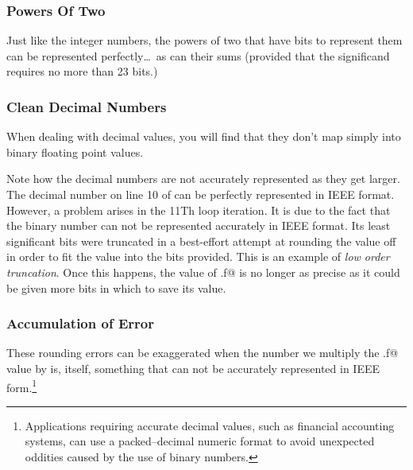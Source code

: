 \subsubsection{Powers Of Two}
Just like the integer numbers, the powers of two that have bits to represent 
them can be represented perfectly\ldots\ as can their sums (provided that the
significand requires no more than 23 bits.)


\subsubsection{Clean Decimal Numbers}
When dealing with decimal values, you will find that they don't map simply
into binary floating point values.

Note how the decimal numbers are not accurately represented as they get larger.
The decimal number on line 10 of 
can be perfectly represented in IEEE format.  However, a problem arises in 
the 11Th loop iteration.  It is due to the fact that the
binary number can not be represented accurately in IEEE format.  Its least
significant bits were truncated in a best-effort attempt at rounding the value
off in order to fit the value into the bits provided.  This is an example of
{\em low order truncation}.  Once this happens, the value of \verb@x.f@ is
no longer as precise as it could be given more bits in which to save its value.


\subsubsection{Accumulation of Error}
These  rounding errors can be exaggerated when the number we multiply 
the \verb@x.f@ value by is, itself, something that can not be accurately 
represented in IEEE 
form.\footnote{Applications requiring accurate decimal values, such as 
financial accounting systems, can use a packed--decimal numeric format
to avoid unexpected oddities caused by the use of binary numbers.}

